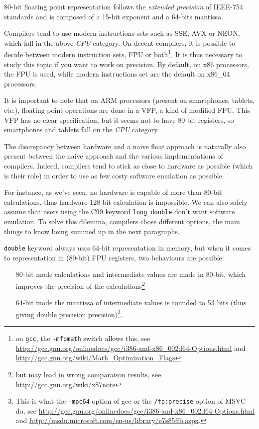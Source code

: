 80-bit floating point representation follows the \emph{extended precision} of IEEE-754 standards and is composed of a 15-bit exponent and a 64-bits mantissa.

Compilers tend to use modern instructions sets such as SSE\TODO{}, AVX\TODO{} or NEON\TODO{}, which fall in the above \emph{CPU} category. On decent compilers, it is possible to decide between modern instruction sets, FPU or both\footnote{on \texttt{gcc}, the \texttt{-mfpmath} switch allows this, see \url{http://gcc.gnu.org/onlinedocs/gcc/i386-and-x86_002d64-Options.html} and \url{http://gcc.gnu.org/wiki/Math_Optimization_Flags}}. It is thus necessary to study this topic if you want to work on precision. By default, on x86 processors, the FPU is used, while modern instructions set are the default on x86\_64 processors.

It is important to note that on ARM processors (present on smartphones, tablets, etc.), floating point operations are done in a VFP, a kind of modified FPU. This VFP has no clear specification, but it seems not to have 80-bit registers, so smartphones and tablets fall on the \emph{CPU} category.


The discrepancy between hardware and a naive float approach is naturally also present between the naive approach and the various implementations of compilers. Indeed, compilers tend to stick as close to hardware as possible (which is their role) in order to use as few costy software emulation as possible.

For instance, as we've seen, no hardware is capable of more than 80-bit calculations, thus hardware 128-bit calculation is impossible. We can also safely assume that users using the C99 keyword \texttt{long double} don't want software emulation. To solve this dilemma, compilers chose different options, the main things to know being summed up in the next paragraphs.


\texttt{double} keyword always uses 64-bit representation in memory, but when it comes to representation in (80-bit) FPU registers, two behaviours are possible:
\begin{enumerate}
\item[80-bit mode] calculations and intermediate values are made in 80-bit, which improves the precision of the calculations\footnote{but may lead in wrong comparaison results, see \url{http://gcc.gnu.org/wiki/x87note}}
\item[64-bit mode] the mantissa of intermediate values is rounded to 53 bits (thus giving double precision precision)\footnote{This is what the \texttt{-mpc64} option of gcc or the \texttt{/fp:precise} option of MSVC do, see \url{http://gcc.gnu.org/onlinedocs/gcc/i386-and-x86\_002d64-Options.html} and \url{http://msdn.microsoft.com/en-us/library/e7s85ffb.aspx}.}.
\end{enumerate}

